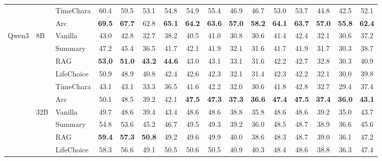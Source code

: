 \documentclass{llmxive}
\begin{document}
\begin{table}[!htbp]
\begin{tabular}{lllccccccccccccc}
 &  & TimeChara & 60.4 & 59.5 & 53.1 & 54.8 & 54.9 & 55.4 & 46.9 & 46.7 & 53.0 & 53.7 & 44.8 & 42.5 & 52.1 \\
 &  & \cellcolor{yellow!15} Arc & \cellcolor{yellow!15} \textbf{69.5} & \cellcolor{yellow!15} \textbf{67.7} & \cellcolor{yellow!15} 62.8 & \cellcolor{yellow!15} \textbf{65.1} & \cellcolor{yellow!15} \textbf{64.2} & \cellcolor{yellow!15} \textbf{63.6} & \cellcolor{yellow!15} \textbf{57.0} & \cellcolor{yellow!15} \textbf{58.2} & \cellcolor{yellow!15} \textbf{64.1} & \cellcolor{yellow!15} \textbf{63.7} & \cellcolor{yellow!15} \textbf{57.0} & \cellcolor{yellow!15} \textbf{55.8} & \cellcolor{yellow!15} \textbf{62.4} \\
\midrule
\multirow[t]{12}{*}{Qwen3} & \multirow[t]{6}{*}{8B} & Vanilla & 43.0 & 42.8 & 32.7 & 38.2 & 40.5 & 41.0 & 30.8 & 30.6 & 41.4 & 42.4 & 32.1 & 30.6 & 37.2 \\
 &  & Summary & 47.2 & 45.4 & 36.5 & 41.7 & 42.1 & 41.9 & 32.1 & 31.6 & 41.7 & 41.9 & 31.7 & 30.3 & 38.7 \\
 &  & RAG & \textbf{53.0} & \textbf{51.0} & \textbf{43.2} & \textbf{44.6} & 43.0 & 43.1 & 33.1 & 31.6 & 42.2 & 42.7 & 32.8 & 30.3 & 40.9 \\
 &  & LifeChoice & 50.9 & 48.9 & 40.8 & 42.4 & 42.6 & 42.3 & 32.1 & 31.4 & 42.3 & 42.2 & 32.1 & 30.0 & 39.8 \\
 &  & TimeChara & 43.1 & 43.1 & 33.3 & 36.5 & 41.6 & 42.2 & 32.0 & 30.6 & 41.8 & 42.8 & 32.7 & 29.4 & 37.4 \\
 &  & \cellcolor{yellow!15} Arc & \cellcolor{yellow!15} 50.1 & \cellcolor{yellow!15} 48.5 & \cellcolor{yellow!15} 39.2 & \cellcolor{yellow!15} 42.1 & \cellcolor{yellow!15} \textbf{47.5} & \cellcolor{yellow!15} \textbf{47.3} & \cellcolor{yellow!15} \textbf{37.3} & \cellcolor{yellow!15} \textbf{36.6} & \cellcolor{yellow!15} \textbf{47.4} & \cellcolor{yellow!15} \textbf{47.5} & \cellcolor{yellow!15} \textbf{37.4} & \cellcolor{yellow!15} \textbf{36.0} & \cellcolor{yellow!15} \textbf{43.1} \\
\cmidrule(l){2-16}
 & \multirow[t]{6}{*}{32B} & Vanilla & 49.7 & 48.6 & 39.4 & 43.4 & 48.6 & 48.6 & 38.8 & 35.8 & 48.6 & 48.6 & 39.2 & 35.0 & 43.7 \\
 &  & Summary & 54.8 & 53.6 & 45.2 & 46.7 & 49.5 & 49.3 & 39.2 & 36.0 & 48.5 & 48.7 & 38.9 & 36.6 & 45.6 \\
 &  & RAG & \textbf{59.4} & \textbf{57.3} & \textbf{50.8} & 49.2 & 49.6 & 49.9 & 40.0 & 38.6 & 48.3 & 48.7 & 39.0 & 36.1 & 47.2 \\
 &  & LifeChoice & 58.3 & 56.6 & 49.1 & 50.5 & 50.6 & 50.5 & 40.9 & 40.3 & 48.4 & 48.6 & 38.8 & 36.3 & 47.4 \\

\end{tabular}
\end{table}
\end{document}

